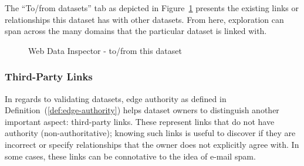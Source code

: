 The ``To/from datasets'' tab as depicted in Figure~\ref{fig:wdi:toFromThisDataset} presents the existing links or relationships this dataset has with other datasets. From here, exploration can span across the many domains that the particular dataset is linked with.

\begin{figure}
	\centering
	\caption{Web Data Inspector - to/from this dataset}
	\label{fig:wdi:toFromThisDataset}
\end{figure}

\subsubsection{Third-Party Links}

In regards to validating datasets, edge authority as defined in Definition~(\ref{def:edge-authority}) helps dataset owners to distinguish another important aspect: third-party links. These represent links that do not have authority (non-authoritative); knowing such links is useful to discover if they are incorrect or specify relationships that the owner does not explicitly agree with. In some cases, these links can be connotative to the idea of e-mail spam.

